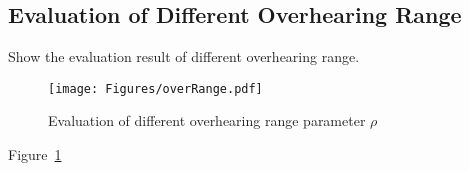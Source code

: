 {\subsection{Evaluation of Different Overhearing Range}
{\color{red}Show the evaluation result of different overhearing range.}
\begin{figure}
\begin{center}
\texttt{[image: Figures/overRange.pdf]}
\caption{\label{fig::evaOverRange}Evaluation of different overhearing range parameter $\rho$}
\end{center}
\end{figure}
%
Figure~\ref{fig::evaOverRange}

}
